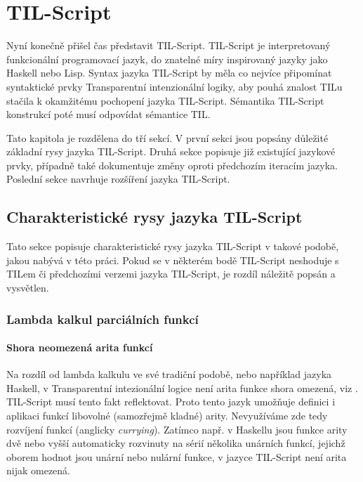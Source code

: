 \chapter{TIL-Script}\label{tilscript-chapter}

Nyní konečně přišel čas představit TIL-Script. TIL-Script je interpretovaný funkcionální
programovací jazyk, do znatelné míry inspirovaný jazyky jako Haskell nebo Lisp. Syntax jazyka
TIL-Script by měla co nejvíce připomínat syntaktické prvky Transparentní intenzionální logiky, aby
pouhá znalost TILu stačila k okamžitému pochopení jazyka TIL-Script. Sémantika TIL-Script konstrukcí
poté musí odpovídat sémantice TIL.

Tato kapitola je rozdělena do tří sekcí. V první sekci jsou popsány důležité základní rysy jazyka
TIL-Script. Druhá sekce popisuje již existující jazykové prvky, případně také dokumentuje změny
oproti předchozím iteracím jazyka. Poslední sekce navrhuje rozšíření jazyka TIL-Script.

\section{Charakteristické rysy jazyka TIL-Script}

Tato sekce popisuje charakteristické rysy jazyka TIL-Script v takové podobě, jakou nabývá v této
práci. Pokud se v některém bodě TIL-Script neshoduje s TILem či předchozími verzemi jazyka
TIL-Script, je rozdíl náležitě popsán a vysvětlen.

\subsection{Lambda kalkul parciálních funkcí}

\subsubsection{Shora neomezená arita funkcí}


Na rozdíl od lambda kalkulu ve své tradiční podobě, nebo například jazyka Haskell, v Transparentní
intezionální logice není arita funkce shora omezená, viz . TIL-Script musí tento
fakt reflektovat. Proto tento jazyk umožňuje definici i aplikaci funkcí libovolné (samozřejmě
kladné) arity. Nevyužíváme zde tedy rozvíjení funkcí (anglicky \textit{currying}). Zatímco např.
v Haskellu jsou funkce arity dvě nebo vyšší automaticky rozvinuty na sérií několika unárních
funkcí, jejichž oborem hodnot jsou unární nebo nulární funkce, v jazyce TIL-Script není arita nijak
omezená.

